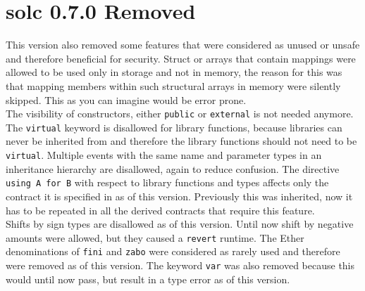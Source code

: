 \section{solc 0.7.0 Removed}
This version also removed some features that were considered as unused or unsafe and therefore beneficial for security. Struct or arrays that contain mappings were allowed to be used only in storage and not in memory, the reason for this was that mapping members within such structural arrays in memory were silently skipped. This as you can imagine would be error prone.\\

The visibility of constructors, either \verb|public| or \verb|external| is not needed anymore. The \verb|virtual| keyword is disallowed for library functions, because libraries can never be inherited from and therefore the library functions should not need to be \verb|virtual|. Multiple events with the same name and parameter types in an inheritance hierarchy are disallowed, again to reduce confusion. The directive \verb|using A for B| with respect to library functions and types affects only the contract it is specified in as of this version. Previously this was inherited, now it has to be repeated in all the derived contracts that require this feature.\\

Shifts by sign types are disallowed as of this version. Until now shift by negative amounts were allowed, but they caused a \verb|revert| runtime. The Ether denominations of \verb|fini| and \verb|zabo| were considered as rarely used and therefore were removed as of this version. The keyword \verb|var| was also removed because this would until now pass, but result in a type error as of this version.

